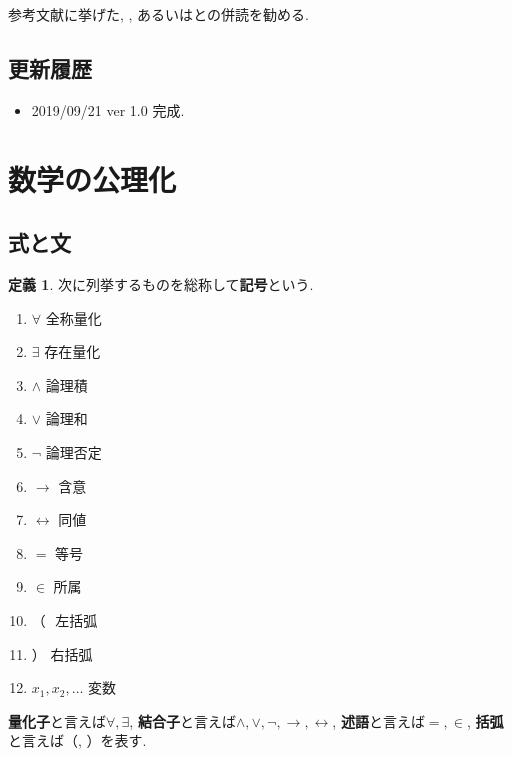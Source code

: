 \documentclass[a4paper, twoside]{bxjsarticle}
\theoremstyle{definition}
\newtheorem{defn}[thm]{定義}
\begin{document}
        参考文献に挙げた, \cite{kunenfound}, あるいは\cite{kunenset}との併読を勧める.
    
    \subsection*{更新履歴}
    \begin{itemize}
        \item 2019/09/21 ver 1.0 完成.
    \end{itemize}

    \newpage
    \tableofcontents
    \cleardoublepage  
    \section{数学の公理化}
    \subsection{式と文}
    \begin{defn}
        次に列挙するものを総称して\textbf{記号}という.
        \begin{enumerate}
            \item $\forall$ 全称量化
            \item $\exists$ 存在量化
            \item $\land$ 論理積
            \item $\lor$ 論理和
            \item $\lnot$ 論理否定
            \item $\to$ 含意
            \item $\leftrightarrow$ 同値
            \item $=$ 等号
            \item $\in$ 所属
            \item  （ \,\,左括弧
            \item  ） 右括弧
            \item $x_1, x_2, \dots$ 変数
        \end{enumerate}
        \textbf{量化子}と言えば$\forall, \exists$,
        \textbf{結合子}と言えば$\land, \lor, \lnot, \to, \leftrightarrow$, \textbf{述語}と言えば$=, \in$, \textbf{括弧}と言えば（, ）を表す.
    \end{defn}
\end{document}
